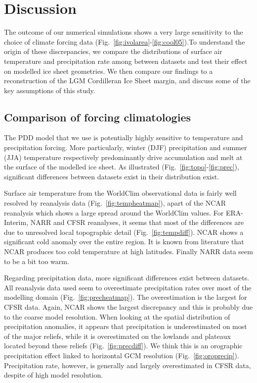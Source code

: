 \section{Discussion}
\label{sec:discussion}

The outcome of our numerical simulations shows a very large sensitivity to the choice of climate forcing data (Fig.~\ref{fig:ivolarea}-\ref{fig:cool05}).To understand the origin of these discrepancies, we compare the distributions of surface air temperature and precipitation rate among between datasets and test their effect on modelled ice sheet geometries. We then compare our findings to a reconstruction of the LGM Cordilleran Ice Sheet margin, and discuss some of the key assumptions of this study.

\subsection{Comparison of forcing climatologies}

The PDD model that we use is potentially highly sensitive to temperature and precipitation forcing. More particularly, winter (DJF) precipitation and summer (JJA) temperature respectively predominantly drive accumulation and melt at the surface of the modelled ice sheet. As illustrated (Fig.~\ref{fig:topo}-\ref{fig:prec}), significant differences between datasets exist in their distribution exist.

Surface air temperature from the WorldClim observational data is fairly well resolved by reanalysis data (Fig.~\ref{fig:tempheatmap}), apart of the NCAR reanalysis which shows a large spread around the WorldClim values. For ERA-Interim, NARR and CFSR reanalyses, it seems that most of the differences are due to unresolved local topographic detail (Fig.~\ref{fig:tempdiff}). NCAR shows a significant cold anomaly over the entire region. It is known from literature that NCAR produces too cold temperature at high latitudes. Finally NARR data seem to be a bit too warm.

Regarding precipitation data, more significant differences exist between datasets. All reanalysis data used seem to overestimate precipitation rates over most of the modelling domain (Fig.~\ref{fig:precheatmap}). The overestimation is the largest for CFSR data. Again, NCAR shows the largest discrepancy and this is probably due to the coarse model resolution. When looking at the spatial distribution of precipitation anomalies, it appears that precipitation is underestimated on most of the major reliefs, while it is overestimated on the lowlands and plateaux located beyond these reliefs (Fig.~\ref{fig:precdiff}). We think this is an orographic precipitation effect linked to horizontal GCM resolution (Fig.~\ref{fig:oroprecip}). Precipitation rate, however, is generally and largely overestimated in CFSR data, despite of high model resolution.

